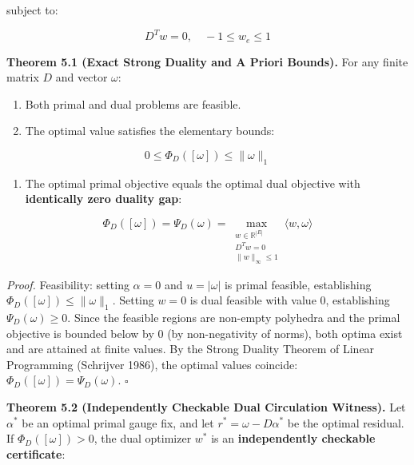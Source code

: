 \documentclass[11pt]{article}
\begin{document}
subject to:

\begin{equation*}
D^T w = 0, \quad -1 \le w_e \le 1
\end{equation*}

\textbf{Theorem 5.1 (Exact Strong Duality and A Priori Bounds).} For any finite matrix $D$ and vector $\omega$:

\begin{enumerate}[leftmargin=1.4em,itemsep=0.2em]
\item Both primal and dual problems are feasible.
\item The optimal value satisfies the elementary bounds:
\end{enumerate}
\begin{equation*}
   0 \le \Phi_D([\omega]) \le \|\omega\|_1
\end{equation*}

\begin{enumerate}[leftmargin=1.4em,itemsep=0.2em]
\item The optimal primal objective equals the optimal dual objective with \textbf{identically zero duality gap}:
\end{enumerate}
\begin{equation*}
   \Phi_D([\omega]) = \Psi_D(\omega) = \max_{\substack{w \in \mathbb{R}^{|E|} \\ D^T w = 0 \\ \|w\|_\infty \le 1}} \langle w, \omega \rangle
\end{equation*}

\emph{Proof.} Feasibility: setting $\alpha = 0$ and $u = |\omega|$ is primal feasible, establishing $\Phi_D([\omega]) \le \|\omega\|_1$. Setting $w = 0$ is dual feasible with value $0$, establishing $\Psi_D(\omega) \ge 0$. Since the feasible regions are non-empty polyhedra and the primal objective is bounded below by $0$ (by non-negativity of norms), both optima exist and are attained at finite values. By the Strong Duality Theorem of Linear Programming (Schrijver 1986), the optimal values coincide: $\Phi_D([\omega]) = \Psi_D(\omega)$. $\square$

\textbf{Theorem 5.2 (Independently Checkable Dual Circulation Witness).} Let $\alpha^*$ be an optimal primal gauge fix, and let $r^* = \omega - D \alpha^*$ be the optimal residual. If $\Phi_D([\omega]) > 0$, the dual optimizer $w^*$ is an \textbf{independently checkable certificate}:
\end{document}
